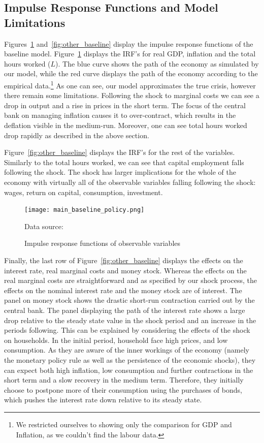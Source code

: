 \documentclass[12pt]{article}
\begin{document}
\subsection*{Impulse Response Functions and Model Limitations}

Figures~\ref{fig:main_baseline} and~\ref{fig:other_baseline} display the impulse response functions of the baseline model. Figure~\ref{fig:main_baseline} displays the IRF's for real GDP, inflation and the total hours worked ($L$). The blue curve shows the path of the economy as simulated by our model, while the red curve displays the path of the economy according to the empirical data.\footnote{We restricted ourselves to showing only the comparison for GDP and Inflation, as we couldn't find the labour data.} As one can see, our model approximates the true crisis, however there remain some limitations. Following the shock to marginal costs we can see a drop in output and a rise in prices in the short term. The focus of the central bank on managing inflation causes it to over-contract, which results in the deflation visible in the medium-run. Moreover, one can see total hours worked drop rapidly as described in the above section. 

Figure~\ref{fig:other_baseline} displays the IRF's for the rest of the variables. Similarly to the total hours worked, we can see that capital employment falls following the shock. The shock has larger implications for the whole of the economy with virtually all of the observable variables falling following the shock: wages, return on capital, consumption, investment. 

\begin{figure}[!h]
    \caption{Impulse response functions of observable variables}\label{fig:main_baseline}
    \centering
    \texttt{[image: main\_baseline\_policy.png]}
    
    \tiny{Data source: \citeauthor{worldbank_inflation_ca}}
\end{figure}

Finally, the last row of Figure~\ref{fig:other_baseline} displays the effects on the interest rate, real marginal costs and money stock. Whereas the effects on the real marginal costs are straightforward and as specified by our shock process, the effects on the nominal interest rate and the money stock are of interest. The panel on money stock shows the drastic short-run contraction carried out by the central bank. The panel displaying the path of the interest rate shows a large drop relative to the steady state value in the shock period and an increase in the periods following. This can be explained by considering the effects of the shock on households. In the initial period, household face high prices, and low consumption. As they are aware of the inner workings of the economy (namely the monetary policy rule as well as the persistence of the economic shocks), they can expect both high inflation, low consumption and further contractions in the short term and a slow recovery in the medium term. Therefore, they initially choose to postpone more of their consumption using the purchases of bonds, which pushes the interest rate down relative to its steady state. 
\end{document}
